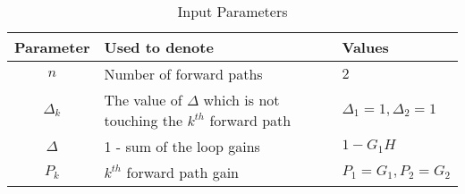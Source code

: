 \begin{table}[ht]
\centering
\setlength{\extrarowheight}{8pt}
\caption{Input Parameters}
\begin{tabular}{|c|l|l|} 
\hline
\textbf{Parameter} & \textbf{Used to denote} & \textbf{Values} \\
\hline
$n$ & Number of forward paths & \multicolumn{1}{|p{1.3cm}|}{\centering $2$ }\\
\hline
$\Delta_k$ & The value of $\Delta$ which is not touching the $k^{th} $ forward path & \multicolumn{1}{|p{1.3cm}|}{\centering $\Delta_1 = 1 , \Delta_2 = 1$ } \\
\hline
$\Delta$ & 1 - sum of the loop gains & \multicolumn{1}{|p{1.3cm}|}{\centering $1-G_1H$ } \\
\hline
$P_k$ & $k^{th}$ forward path gain & \multicolumn{1}{|p{1.3cm}|}{\centering $P_1 = G_1 , P_2 = G_2$ } \\
\hline
\end{tabular}
 \vspace{4mm}
\end{table}
